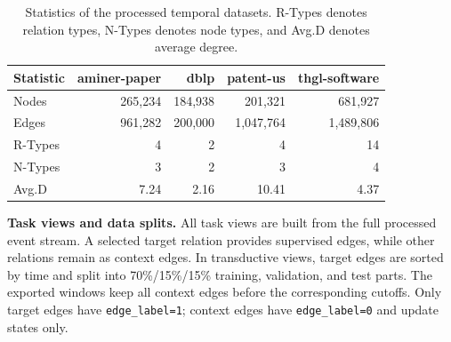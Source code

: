 \begin{table}[t]
\centering
\caption{Statistics of the processed temporal datasets. R-Types denotes relation types, N-Types denotes node types, and Avg.D denotes average degree.}
\label{tab:dataset_stats}
\scriptsize
\setlength{\tabcolsep}{5pt}
\begin{tabular}{lrrrr}
\toprule
Statistic & aminer-paper & dblp & patent-us & thgl-software \\
\midrule
Nodes       & 265,234 & 184,938 & 201,321 & 681,927 \\
Edges       & 961,282 & 200,000 & 1,047,764 & 1,489,806 \\
R-Types     & 4       & 2       & 4         & 14 \\
N-Types     & 3       & 2       & 3         & 4 \\
Avg.D       & 7.24    & 2.16    & 10.41     & 4.37 \\
\bottomrule
\end{tabular}
\end{table}

\noindent\textbf{Task views and data splits.}
All task views are built from the full processed event stream. 
A selected target relation provides supervised edges, while other relations remain as context edges. 
In transductive views, target edges are sorted by time and split into 70\%/15\%/15\% training, validation, and test parts. 
The exported windows keep all context edges before the corresponding cutoffs. Only target edges have \texttt{edge\_label=1}; context edges have \texttt{edge\_label=0} and update states only. 

